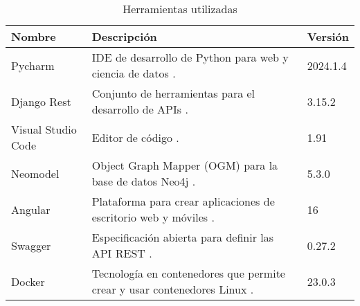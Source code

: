 \begin{table}[H]
    \centering
    \begin{tabular}{|m{2.5cm}|m{6cm}|m{3cm}|}
        \hline
        \textbf{Nombre} &  \textbf{Descripción} & \textbf{Versión} \\
        \hline
        Pycharm &  IDE de desarrollo de Python para web y ciencia de datos \cite{PycharmIDE}. &  2024.1.4 \\
        \hline
        Django Rest &  Conjunto de herramientas para el desarrollo de APIs  \cite{DRFweb}. & 3.15.2 \\
        \hline
         Visual Studio Code & Editor de código \cite{VSCODE}.  & 1.91 \\
        \hline
        Neomodel &  Object Graph Mapper (OGM) para la base de datos Neo4j \cite{NEOMODEL}. & 5.3.0 \\
        \hline
        Angular &  Plataforma para crear aplicaciones de escritorio web y móviles \cite{ANGULAR}. & 16 \\
        \hline
        Swagger & Especificación abierta para definir las API REST  \cite{SWAGGER}. & 0.27.2 \\
        \hline
        Docker & Tecnología en contenedores que permite crear y usar contenedores Linux \cite{DOCKER}.  & 23.0.3 \\
        \hline
    \end{tabular}
    \caption{Herramientas utilizadas}
    \label{tab:Tabla de herramientas utilizadas}
\end{table}
